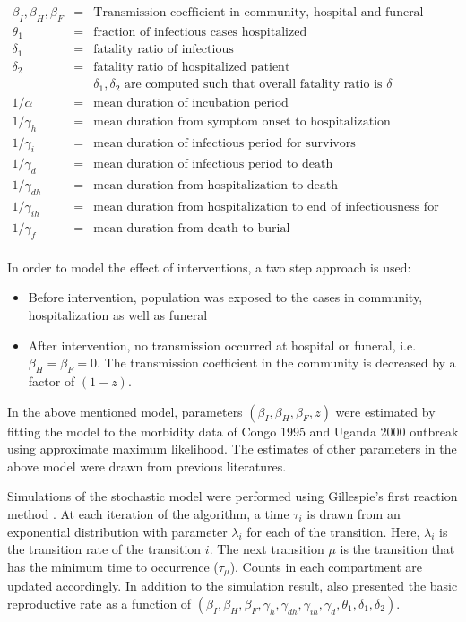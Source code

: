 \documentclass[12pt, journal,onecolumn]{IEEEtran}
\begin{document}
\begin{eqnarray*}
\beta_I, \beta_H, \beta_F &=& \text{Transmission coefficient in community, hospital and funeral respectively}\\
\theta_1 &=& \text{fraction of infectious cases hospitalized}\\
\delta_1 &=& \text{fatality ratio of infectious}\\
\delta_2 &=& \text{fatality ratio of hospitalized patient}\\
&& \delta_1, \delta_2 \text{ are computed such that overall fatality ratio is $\delta$}\\
1/\alpha &=& \text{mean duration of incubation period}\\
1/\gamma_h &=& \text{mean duration from symptom onset to hospitalization}\\
1/\gamma_{i} &=& \text{mean duration of infectious period for survivors}\\
1/\gamma_{d} &=& \text{mean duration of infectious period to death}\\
1/\gamma_{dh} &=& \text{mean duration from hospitalization to death}\\
1/\gamma_{ih} &=& \text{mean duration from hospitalization to end of infectiousness for survivors}\\
1/\gamma_{f} &=& \text{mean duration from death to burial}\\
\end{eqnarray*}

In order to model the effect of interventions, a two step approach is used:

\begin{itemize}
\item Before intervention, population was exposed to the cases in community, hospitalization as well as funeral
\item After intervention, no transmission occurred at hospital or funeral, i.e. $\beta_H = \beta_F = 0$. The transmission coefficient in the community is decreased by a factor of $(1-z)$.
\end{itemize}

In the above mentioned model, parameters $(\beta_I, \beta_H, \beta_F , z)$ were estimated by fitting the model to the morbidity data of Congo 1995 and Uganda 2000 outbreak using approximate maximum likelihood. The estimates of other parameters in the above model were drawn from previous literatures.

Simulations of the stochastic model were performed using Gillespie's first reaction method \cite{gillespie1976general}. At each iteration of the algorithm, a time $\tau_i$ is drawn from an exponential distribution with parameter $\lambda_i$ for each of the transition. Here, $\lambda_i$ is the transition rate of the transition $i$. The next transition $\mu$ is the transition that has the minimum time to occurrence ($\tau_\mu$). Counts in each compartment are updated accordingly. In addition to the simulation result,  \cite{legrand2007understanding} also presented the basic reproductive rate as a function of $(\beta_I,\beta_H,\beta_F,\gamma_h,\gamma_{dh},\gamma_{ih},\gamma_d,\theta_1,\delta_1,\delta_2)$.
\end{document}
